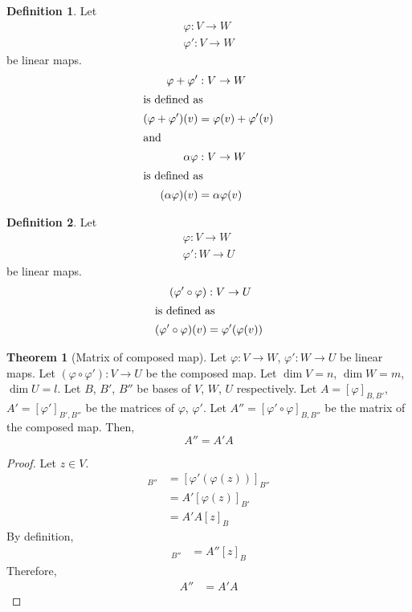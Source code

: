 \documentclass[fleqn, a4paper, 12pt]{article}
\theoremstyle{definition}
\newtheorem{definition}{Definition} %
\theoremstyle{theorem}
\newtheorem{theorem}{Theorem} %
\theoremstyle{remark}
\numberwithin{equation}{theorem}
\begin{document}
\begin{definition}
	Let
	\begin{align*}
		\varphi : V \to W\\
		\varphi' : V \to W
	\end{align*}
	be linear maps.
	\begin{align*}
		\varphi + \varphi' &: V \to W\\
		\intertext{is defined as}
		(\varphi + \varphi')(v) &= \varphi(v) + \varphi'(v)\\
		\intertext{and}
		\alpha \varphi &: V \to W\\
		\intertext{is defined as}
		(\alpha \varphi)(v) &= \alpha \varphi(v)
	\end{align*}
\end{definition}

\begin{definition}
	Let
	\begin{align*}
		\varphi : V \to W\\
		\varphi' : W \to U
	\end{align*}
	be linear maps.
	\begin{align*}
	(\varphi' \circ \varphi) &: V \to U\\
	\intertext{is defined as}
	(\varphi' \circ \varphi)(v) &= \varphi'(\varphi(v))
	\end{align*}
\end{definition}

\begin{theorem}[Matrix of composed map]
	Let $\varphi : V \to W$, $\varphi' : W \to U$ be linear maps. Let $(\varphi \circ \varphi') : V \to U$ be the composed map. Let $\dim V = n$, $\dim W = m$, $\dim U = l$. Let $B$, $B'$, $B''$ be bases of $V$, $W$, $U$ respectively. Let $A = [\varphi]_{B, B'}$, $A' = [\varphi']_{B', B''}$ be the matrices of $\varphi$, $\varphi'$. Let $A'' = [\varphi' \circ \varphi]_{B, B''}$ be the matrix of the composed map. Then, 
	\begin{equation*}
		A'' = A' A
	\end{equation*}
\end{theorem}

\begin{proof}
	Let $z \in V$.
	\begin{align*}
		[(\varphi' \circ \varphi)(z)]_{B''} &= [\varphi' (\varphi (z))]_{B''}\\
		&= A' [\varphi (z)]_{B'}\\
		&= A' A [z]_B
	\end{align*}
	By definition,
	\begin{align*}
		[(\varphi' \circ \varphi) (z)]_{B''} &= A'' [z]_B
	\end{align*}
	Therefore,
	\begin{align*}
		A'' &= A' A
	\end{align*}
\end{proof}
\end{document}
